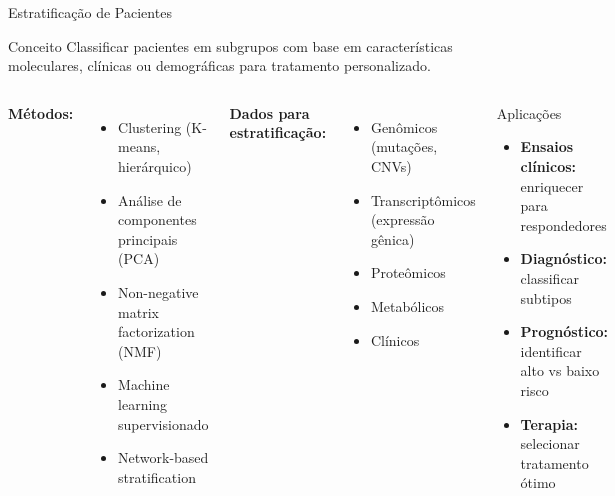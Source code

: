 \begin{frame}{Estratificação de Pacientes}
\begin{block}{Conceito}
Classificar pacientes em subgrupos com base em características moleculares, clínicas ou demográficas para tratamento personalizado.
\end{block}

\vspace{0.3cm}

\begin{columns}
\textbf{Métodos:}
\begin{itemize}
    \item Clustering (K-means, hierárquico)
    \item Análise de componentes principais (PCA)
    \item Non-negative matrix factorization (NMF)
    \item Machine learning supervisionado
    \item Network-based stratification
\end{itemize}

\vspace{0.3cm}

\textbf{Dados para estratificação:}
\begin{itemize}
    \item Genômicos (mutações, CNVs)
    \item Transcriptômicos (expressão gênica)
    \item Proteômicos
    \item Metabólicos
    \item Clínicos
\end{itemize}

\begin{exampleblock}{Aplicações}
\begin{itemize}
    \item \textbf{Ensaios clínicos:} enriquecer para respondedores
    \item \textbf{Diagnóstico:} classificar subtipos
    \item \textbf{Prognóstico:} identificar alto vs baixo risco
    \item \textbf{Terapia:} selecionar tratamento ótimo
\end{itemize}
\end{exampleblock}

\vspace{0.3cm}

\end{columns}
\end{frame}

